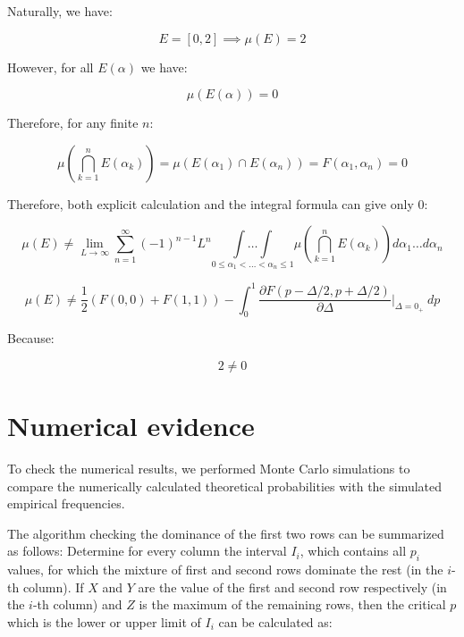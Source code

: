 \documentclass{article}
\theoremstyle{definition}
\begin{document}
\begin{appendices}
Naturally, we have:

\begin{equation}
    E = [0,2] \implies \mu(E) = 2
\end{equation}

However, for all $E(\alpha)$ we have:

\begin{equation}
    \mu(E(\alpha)) = 0
\end{equation}

Therefore, for any finite $n$:

\begin{equation}
    \mu \left ( 
    \bigcap_{k=1}^n E(\alpha_k)
    \right ) 
    =
    \mu \left (
    E(\alpha_1) \cap E(\alpha_n)
    \right )
    =
    F(\alpha_1,\alpha_n)
    =0
\end{equation}

Therefore, both explicit calculation and the integral formula can give only $0$:

\begin{equation}
    \mu(E) \ne \lim_{L \to \infty} \sum_{n=1}^\infty (-1)^{n-1} L^n
    \underset{0 \le \alpha_1 < \dots < \alpha_n \le 1}{\int\dots\int}
    \mu \left ( 
    \bigcap_{k=1}^n E(\alpha_k)
    \right ) 
    d\alpha_1\dots d\alpha_n
\end{equation}

\begin{equation}
    \mu(E) 
    \ne
    \frac{1}{2} \left ( F(0,0)+F(1,1) \right ) 
    - \int_0^1
    \frac{\partial
    F(p - \Delta/2, p + \Delta/2) 
    }{\partial \Delta}
    \Bigg |_{\Delta=0_+}
    \ dp
\end{equation}

Because:

\begin{equation}
    2 \ne 0
\end{equation}

\section{Numerical evidence}

To check the numerical results, we performed Monte Carlo simulations \cite{book:MonteCarlo} to compare the numerically calculated theoretical probabilities with the simulated empirical frequencies.

The algorithm checking the dominance of the first two rows can be summarized as follows:
Determine for every column the interval $I_i$, which contains all $p_i$ values, for which the mixture of first and second rows dominate the rest (in the $i$-th column).
If $X$ and $Y$ are the value of the first and second row respectively (in the $i$-th column) and $Z$ is the maximum of the remaining rows, then the critical $p$ which is the lower or upper limit of $I_i$ can be calculated as: 


\end{appendices}
\end{document}
